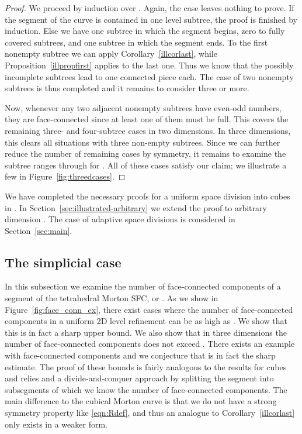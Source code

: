 \documentclass[a4paper,11pt]{article}
\newcommand{\eqnref}[1]{\eqref{eqn:#1}}
\newcommand{\figref}[1]{Figure~\ref{fig:#1}}
\newcommand{\seclab}[1]{\label{sec:#1}}
\newcommand{\secref}[1]{Section~\ref{sec:#1}}
\begin{document}
\begin{proof}
  We proceed by induction over .
  Again, the case  leaves nothing to prove.  If the segment of the curve
  is contained in one level  subtree, the proof is finished by
  induction.  Else we have one subtree in which the segment begins, zero to
   fully covered subtrees, and one subtree in which the segment
  ends.  To the first nonempty subtree we can apply Corollary~\ref{illcorlast},
  while Proposition~\ref{illpropfirst} applies to the last one.  Thus we know that
  the possibly incomplete subtrees lead to one connected piece each.  The case
  of two nonempty subtrees is thus completed and it remains to consider three
  or more.

  Now, whenever any two adjacent nonempty subtrees have even-odd numbers, they
  are face-connected since at least one of them must be full.  This covers the
  remaining three- and four-subtree cases in two dimensions.  In three
  dimensions, this clears all situations with three non-empty subtrees.  Since
  we can further reduce the number of remaining cases by symmetry, it remains
  to examine the subtree ranges  through 
  for .  All of these cases satisfy our claim; we
  illustrate a few in \figref{threedcases}.
\end{proof}
We have completed the necessary proofs for a uniform space division into cubes
in .
In \secref{illustrated-arbitrary} we extend the proof to arbitrary
dimension .
The case of adaptive space divisions is considered in \secref{main}.

\subsection{The simplicial case}
\seclab{illustrated-simplicial}

In this subsection we examine the number of face-connected components of a
segment of the tetrahedral Morton SFC,  or .
As we show in Figure~\ref{fig:face_conn_ex}, there exist cases where the number
of face-connected components in a uniform 2D level  refinement can be as
high as .
We show that this is in fact a sharp upper bound.
We also show that in three dimensions the number of face-connected components
does not exceed . There exists an example with  face-connected
components and we conjecture that  is in fact the sharp estimate.
The proof of these bounds is fairly analogous to the results for cubes and 
relies and a divide-and-conquer approach by splitting the segment into 
subsegments of which we know the number of face-connected components.
The main difference to the cubical Morton curve is that we do not have a
strong symmetry property like \eqnref{Rdef}, and thus an analogue to
Corollary~\ref{illcorlast} only exists in a weaker form.
\end{document}
